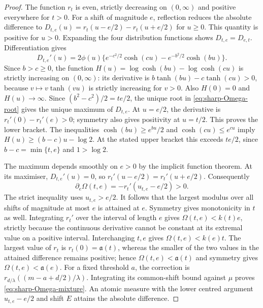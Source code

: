 \documentclass[11pt]{article}
\begin{document}
\begin{proof}
The function $r_t$ is even, strictly decreasing on $(0,\infty)$ and
positive everywhere for $t>0$. For a shift of magnitude $e$, reflection
reduces the absolute difference to
$D_{t,e}(u)=r_t(u-e/2)-r_t(u+e/2)$ for $u\geq0$. This quantity is
positive for $u>0$. Expanding the four distribution functions shows
$D_{t,e}=D_{e,t}$. Differentiation gives
\begin{equation}
 D_{t,e}'(u)=2\phi(u)\{
 e^{-c^2/2}\cosh(cu)-e^{-b^2/2}\cosh(bu)\}.
 \label{eq:sharp-Omega-derivative}
\end{equation}
Since $b>c\geq0$, the function
$H(u)=\log\cosh(bu)-\log\cosh(cu)$ is strictly increasing on
$(0,\infty)$: its derivative is
$b\tanh(bu)-c\tanh(cu)>0$, because $v\mapsto v\tanh(vu)$ is
strictly increasing for $v>0$. Also $H(0)=0$ and $H(u)\to\infty$.
Since $(b^2-c^2)/2=te/2$, the unique root in
\eqref{eq:sharp-Omega-root} gives the unique maximum of $D_{t,e}$.
At $u=e/2$, the derivative is $r_t'(0)-r_t'(e)>0$; symmetry also
gives positivity at $u=t/2$. This proves the lower bracket.
The inequalities $\cosh(bu)\geq e^{bu}/2$ and
$\cosh(cu)\leq e^{cu}$ imply
$H(u)\geq(b-c)u-\log2$. At the stated upper bracket this exceeds
$te/2$, since $b-c=\min\{t,e\}$ and $1>\log2$.

The maximum depends smoothly on $e>0$ by the implicit function
theorem. At its maximiser, $D_{t,e}'(u)=0$, so
$r_t'(u-e/2)=r_t'(u+e/2)$. Consequently
\begin{equation}
 \partial_e\Omega(t,e)
   =-r_t'(u_{t,e}-e/2)>0.
 \label{eq:sharp-Omega-monotonicity}
\end{equation}
The strict inequality uses $u_{t,e}>e/2$. It follows that the largest
modulus over all shifts of magnitude at most $e$ is attained at $e$.
Symmetry gives monotonicity in $t$ as well. Integrating $r_t'$ over
the interval of length $e$ gives $\Omega(t,e)<k(t)e$, strictly because
the continuous derivative cannot be constant at its extremal value on
a positive interval. Interchanging $t,e$ gives $\Omega(t,e)<k(e)t$.
The largest value of $r_t$ is $r_t(0)=\mathfrak a(t)$, whereas the smaller
of the two values in the attained difference remains positive; hence
$\Omega(t,e)<\mathfrak a(t)$ and symmetry gives $\Omega(t,e)<\mathfrak a(e)$.
For a fixed threshold $a$, the correction is
$r_{d/\lambda}((m-a+d/2)/\lambda)$. Integrating its common-shift
bound against $\mu$ proves \eqref{eq:sharp-Omega-mixture}.
An atomic measure with the lower centred argument
$u_{t,e}-e/2$ and shift $E$ attains the absolute difference.
\end{proof}
\end{document}
